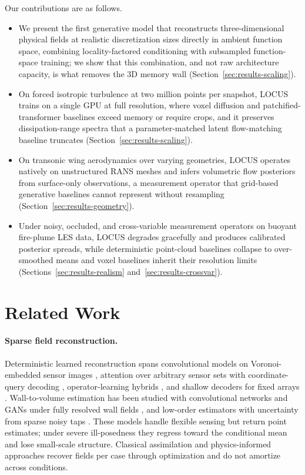 \documentclass{article} %
\newcommand{\model}{LOCUS}
\begin{document}
Our contributions are as follows.
\begin{itemize}
\item We present the first generative model that reconstructs three-dimensional physical fields at realistic discretization sizes directly in ambient function space, combining locality-factored conditioning with subsampled function-space training; we show that this combination, and not raw architecture capacity, is what removes the 3D memory wall (Section~\ref{sec:results-scaling}).
\item On forced isotropic turbulence at two million points per snapshot, \model{} trains on a single GPU at full resolution, where voxel diffusion and patchified-transformer baselines exceed memory or require crops, and it preserves dissipation-range spectra that a parameter-matched latent flow-matching baseline truncates (Section~\ref{sec:results-scaling}).
\item On transonic wing aerodynamics over varying geometries, \model{} operates natively on unstructured RANS meshes and infers volumetric flow posteriors from surface-only observations, a measurement operator that grid-based generative baselines cannot represent without resampling (Section~\ref{sec:results-geometry}).
\item Under noisy, occluded, and cross-variable measurement operators on buoyant fire-plume LES data, \model{} degrades gracefully and produces calibrated posterior spreads, while deterministic point-cloud baselines collapse to over-smoothed means and voxel baselines inherit their resolution limits (Sections~\ref{sec:results-realism} and~\ref{sec:results-crossvar}).
\end{itemize}

\section{Related Work}
\label{sec:related}

\paragraph{Sparse field reconstruction.}
Deterministic learned reconstruction spans convolutional models on Voronoi-embedded sensor images \citep{fukami2021global}, attention over arbitrary sensor sets with coordinate-query decoding \citep{santos2023senseiver}, operator-learning hybrids \citep{dang2025flronet}, and shallow decoders for fixed arrays \citep{erichson2020shallow}. Wall-to-volume estimation has been studied with convolutional networks and GANs under fully resolved wall fields \citep{guastoni2021convolutional,cuellar2024three}, and low-order estimators with uncertainty from sparse noisy taps \citep{mousavi2025low}. These models handle flexible sensing but return point estimates; under severe ill-posedness they regress toward the conditional mean and lose small-scale structure. Classical assimilation and physics-informed approaches \citep{raissi2020hidden,cai2021flow} recover fields per case through optimization and do not amortize across conditions.
\end{document}
